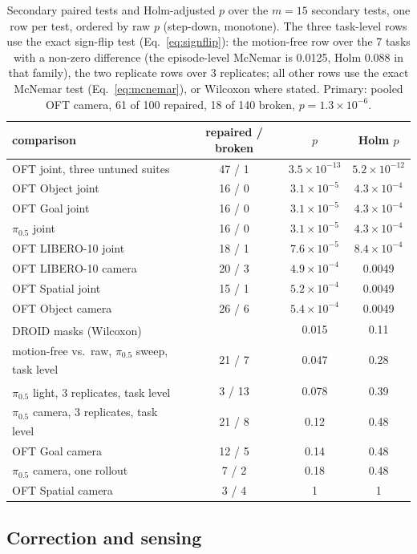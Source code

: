 \documentclass{article}
\newcommand{\pihalf}{$\pi_{0.5}$}
\newcommand{\ph}{\textsuperscript{\dag}}
\begin{document}
\begin{table}[h]
\centering\small
\caption{Secondary paired tests and Holm-adjusted $p$ over the $m = 15$ secondary tests, one row per test, ordered by
raw $p$ (step-down, monotone). The three task-level rows use the exact sign-flip test
(Eq.~\ref{eq:signflip}): the motion-free row over the 7 tasks with a non-zero difference (the episode-level McNemar is
0.0125, Holm 0.088 in that family), the two replicate rows over 3 replicates; all other rows use the exact McNemar test
(Eq.~\ref{eq:mcnemar}), or Wilcoxon where stated. Primary: pooled OFT camera, 61 of 100 repaired, 18 of 140 broken, $p =
1.3\times10^{-6}$.}
\label{tab:holm}
\begin{tabular}{lccc}
\toprule
comparison & repaired / broken & $p$ & Holm $p$ \\
\midrule
OFT joint, three untuned suites & 47 / 1 & $3.5\times10^{-13}$ & $5.2\times10^{-12}$ \\
OFT Object joint & 16 / 0 & $3.1\times10^{-5}$ & $4.3\times10^{-4}$ \\
OFT Goal joint & 16 / 0 & $3.1\times10^{-5}$ & $4.3\times10^{-4}$ \\
\pihalf{} joint & 16 / 0 & $3.1\times10^{-5}$ & $4.3\times10^{-4}$ \\
OFT LIBERO-10 joint & 18 / 1 & $7.6\times10^{-5}$ & $8.4\times10^{-4}$ \\
OFT LIBERO-10 camera & 20 / 3 & $4.9\times10^{-4}$ & 0.0049 \\
OFT Spatial joint & 15 / 1 & $5.2\times10^{-4}$ & 0.0049 \\
OFT Object camera & 26 / 6 & $5.4\times10^{-4}$ & 0.0049 \\
DROID masks (Wilcoxon)\ph & & 0.015 & 0.11 \\
motion-free vs.\ raw, \pihalf{} sweep, task level\ph & 21 / 7 & 0.047 & 0.28 \\
\pihalf{} light, 3 replicates, task level\ph & 3 / 13 & 0.078 & 0.39 \\
\pihalf{} camera, 3 replicates, task level\ph & 21 / 8 & 0.12 & 0.48 \\
OFT Goal camera & 12 / 5 & 0.14 & 0.48 \\
\pihalf{} camera, one rollout & 7 / 2 & 0.18 & 0.48 \\
OFT Spatial camera & 3 / 4 & 1 & 1 \\
\bottomrule
\end{tabular}
\end{table}

\subsection{Correction and sensing}
\end{document}
